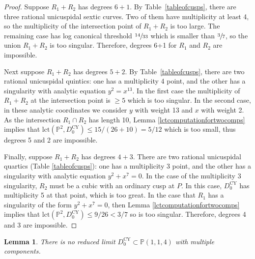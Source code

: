\documentclass[JEP,XML,SOM,Unicode,NoFloatCountersInSection,published]{cedram}
\theoremstyle{plain}
\newtheorem{lemma}[theorem]{Lemma}
\theoremstyle{definition}
\newcommand\PP{{\mathbb{P}}}
\newcommand\lct{\mathrm{lct}}
\newcommand\Dcyo{{D^{\mathrm{CY}}_0}}
\begin{document}
\begin{proof}
Suppose $R_1+R_2$ has degrees $6+1$. By Table~\ref{tableofcusps}, there are three rational unicuspidal sextic curves. Two of them have multiplicity at least 4, so the multiplicity of the intersection point of $R_1+R_2$ is too large. The remaining case has log canonical threshold $\sfrac{14}{33}$ which is smaller than $\sfrac{3}{7}$, so the union $R_1 + R_2$ is too singular. Therefore, degrees 6+1 for $R_1$ and $R_2$ are impossible.

Next suppose $R_1+R_2$ has degrees $5+2$. By Table~\ref{tableofcusps}, there are two rational unicuspidal quintics: one has a multiplicity 4 point, and the other has a singularity with analytic equation $y^2=x^{13}$. In the first case the multiplicity of $R_1+R_2$ at the intersection point is $\ge 5$ which is too singular. In the second case, in these analytic coordinates we consider $y$ with weight 13 and $x$ with weight 2. As the intersection $R_1\cap R_2$ has length 10, Lemma \ref{lctcomputationfortwocomps} implies that $\lct(\PP^2,\Dcyo)\le 15/(26+10) = 5/12$ which is too small, thus degrees 5 and 2 are impossible.

Finally, suppose $R_1+R_2$ has degrees $4+3$. There are two rational unicuspidal quartics (Table \ref{tableofcusps}): one has a multiplicity 3 point, and the other has a singularity with analytic equation $y^2+x^7=0$. In the case of the multiplicity 3 singularity, $R_2$ must be a cubic with an ordinary cusp at $P$. In this case, $\Dcyo$ has multiplicity 5 at that point, which is too great. In the case that $R_1$ has a singularity of the form $y^2+x^7=0$, then Lemma \ref{lctcomputationfortwocomps} implies that $\lct(\PP^2,\Dcyo) \le 9/26 <3/7$ so is too singular. Therefore, degrees 4 and 3 are impossible.
\end{proof}

\begin{lemma}\label{multiplep112}
There is no reduced limit $\Dcyo\subset \PP(1,1,4)$ with multiple components.
\end{lemma}
\end{document}
